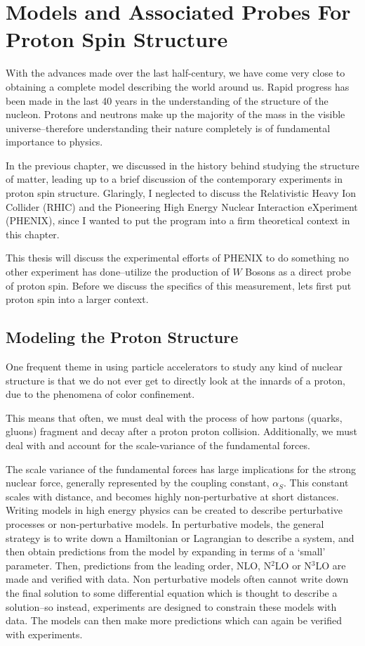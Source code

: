\chapter{Models and Associated Probes For Proton Spin Structure}
\label{ch:modeling_proton_spin}

With the advances made over the last half-century, we have come very close to
obtaining a complete model describing the world around us.  Rapid progress has
been made in the last 40 years in the understanding of the structure of the
nucleon. Protons and neutrons make up the majority of the mass in the visible
universe--therefore understanding their nature completely is of fundamental
importance to physics.

In the previous chapter, we discussed in the history behind studying the
structure of matter, leading up to a brief discussion of the contemporary
experiments in proton spin structure. Glaringly, I neglected to discuss the
Relativistic Heavy Ion Collider (RHIC) and the Pioneering High Energy Nuclear
Interaction eXperiment (PHENIX), since I wanted to put the program into a firm
theoretical context in this chapter.

This thesis will discuss the experimental efforts of PHENIX to do something no
other experiment has done--utilize the production of $W$ Bosons as a direct probe
of proton spin. Before we discuss the specifics of this measurement, lets first
put proton spin into a larger context.

\section{Modeling the Proton Structure}

One frequent theme in using particle accelerators to study any kind of nuclear
structure is that we do not ever get to directly look at the innards of a
proton, due to the phenomena of color confinement. 

This means that often, we must deal with the process of how partons (quarks,
gluons) fragment and decay after a proton proton collision. Additionally, we
must deal with and account for the scale-variance of the fundamental forces. 

The scale variance of the fundamental forces has large implications for the
strong nuclear force, generally represented by the coupling constant,
$\alpha_S$. This constant scales with distance, and becomes highly
non-perturbative at short distances. Writing models in high energy physics can
be created to describe perturbative processes or non-perturbative models.  In
perturbative models, the general strategy is to write down a Hamiltonian or
Lagrangian to describe a system, and then obtain predictions from the model by
expanding in terms of a `small' parameter. Then, predictions from the leading
order, NLO, N$^2$LO or N$^3$LO are made and verified with data. Non perturbative
models often cannot write down the final solution to some differential equation
which is thought to describe a solution--so instead, experiments are designed to
constrain these models with data. The models can then make more predictions
which can again be verified with experiments. 

